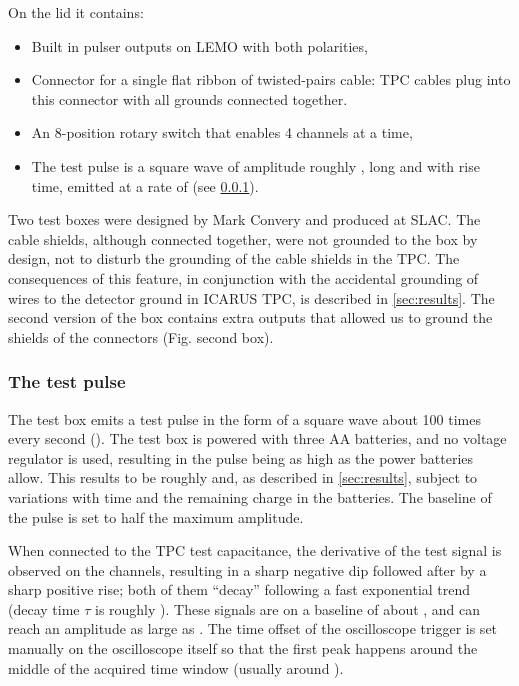 On the lid it contains:
\begin{itemize}
\item Built in pulser outputs on LEMO with both polarities,
\item Connector for a single flat ribbon of twisted-pairs cable: TPC cables plug into this connector with all grounds connected together.
\item An 8-position rotary switch that enables 4 channels at a time,
\item The test pulse is a square wave of amplitude roughly ,  long and with  rise time, emitted at a rate of  (see \cref{sssec:TestBox:TestPulse}).
\end{itemize}

Two test boxes were designed by Mark Convery and produced at SLAC.
The cable shields, although connected together, were not grounded to the box
by design, not to disturb the grounding of the cable shields in the TPC.
The consequences of this feature, in conjunction with the accidental grounding of wires to the detector ground in ICARUS TPC, is described in \cref{sec:results}.  The second version of the box contains extra outputs that allowed us to ground the shields of the connectors (Fig. second box). 

\subsubsection{The test pulse}
\label{sssec:TestBox:TestPulse}

The test box emits a test pulse in the form of a square wave about 100 times
every second ().
The test box is powered with three  AA batteries, and no voltage
regulator is used, resulting in the pulse being as high as the power batteries
allow. This results to be roughly  and, as described in
\cref{sec:results}, subject to variations with time and the remaining charge in
the batteries. The baseline of the pulse is set to half the maximum amplitude.

When connected to the TPC test capacitance, the derivative of the
test signal is observed on the channels, resulting in a sharp negative
dip followed after  by a sharp positive rise; both of them
``decay'' following a fast exponential trend (decay time $\tau$ is roughly
). These signals are on a baseline of about , and can reach an
amplitude as large as . The time offset of the oscilloscope trigger is set
manually on the  oscilloscope itself so that the first peak happens around the
middle of the acquired time window (usually around ).

